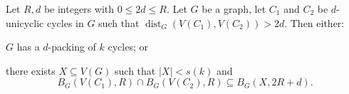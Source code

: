 \documentclass{patmorin}
\newcommand{\pat}[1]{\textcolor{Blue}{Pat: #1}}
\newcommand{\piotr}[1]{\textcolor{red}{Piotr: #1}}
\DeclareMathOperator{\dist}{dist}
\DeclarePairedDelimiter\set{\{}{\}}
\begin{document}


\begin{lem}\label{double_unicycle}
  Let $R,d$ be integers with $0\leq 2d\leq R$.
  Let $G$ be a graph,
  let $C_1$ and $C_2$ be $d$-unicyclic cycles in $G$ such that
  $\dist_G(V(C_1),V(C_2))>2d$.
  Then either:
  \begin{compactenum}[(a)]
    \item $G$ has a $d$-packing of $k$ cycles; or
    \item there exists $X\subseteq V(G)$ such that $|X|< s(k)$ and \[
    B_{G}(V(C_1),R)\cap B_{G}(V(C_2),R) \subseteq B_G(X,2R+d).%
    \]
  \end{compactenum}
\end{lem}
\end{document}
